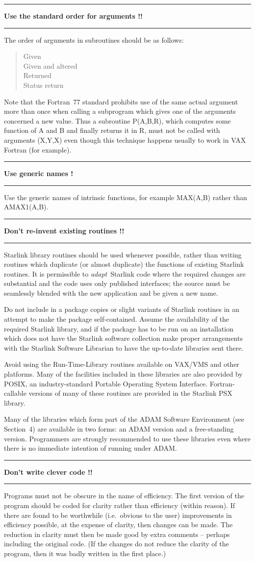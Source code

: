 \documentclass[twoside,11pt,nolof,noabs]{starlink}
\newcounter{sruleno}
\providecommand{\srule}[1]{
    \addtocounter{sruleno}{1}
    \goodbreak
    \rule{\textwidth}{0.3mm}
    \textbf{#1} \scpushright{ \textbf{\thesruleno}}
    \rule{\textwidth}{0.1mm}
}
\renewcommand{\_}{{\tt\char'137}}
\begin{document}
\srule{Use the standard order for arguments !!}
The order of arguments in subroutines should be as follows:
\begin{quote}
Given\\
Given and altered\\
Returned\\
Status return
\end{quote}
Note that the Fortran~77 standard prohibits use of the same actual argument more
than once when calling a subprogram which gives one of the arguments concerned a
new value.  Thus a subroutine \mbox{P(A,B,R)},
which computes some function of A and B and finally returns it in R, must not
be called with arguments (X,Y,X) even
though this technique happens usually to work in VAX Fortran (for example).

\srule{Use generic names !}
Use the generic names of intrinsic functions, for example
MAX(A,B) rather than AMAX1(A,B).

\srule{Don't re-invent existing routines !!}
Starlink library routines should be used whenever possible, rather than
writing routines which duplicate (or almost duplicate) the functions of
existing Starlink routines.
It is permissible to \textit{adapt}\, Starlink code where the required changes are
substantial and the code uses only published interfaces; the source must be
seamlessly blended with the new application and be given a new name.

Do not include in a package copies or slight variants of
Starlink routines in an attempt to make the package self-contained.
Assume the availability of the required Starlink library, and if the package has
to be run on an installation which does not have the Starlink software
collection make proper arrangements with the Starlink Software Librarian
to have the up-to-date libraries sent there.

Avoid using the Run-Time-Library routines available on VAX/VMS and other
platforms.  Many of the facilities included in these libraries are also
provided by POSIX, an industry-standard Portable Operating System Interface.
Fortran-callable versions of many of these routines are provided in the
Starlink PSX library.

Many of the libraries which form part of the ADAM Software
Environment (see Section~4) are available in two forms:  an
ADAM version and a free-standing version.  Programmers are
strongly recommended to use these libraries even where there
is no immediate intention of running under ADAM.

\srule{Don't write clever code !!}
Programs must not be obscure in the name of efficiency.
The first version of the program should be coded for clarity rather than
efficiency (within reason).
If there are found to be worthwhile (i.e.\ obvious to the user) improvements in
efficiency possible, at the expense of clarity, then changes can be made.
The reduction in clarity must then be made good by extra comments -- perhaps
including the original code.
(If the changes do not reduce the clarity of the program, then it was badly
written in the first place.)
\end{document}

